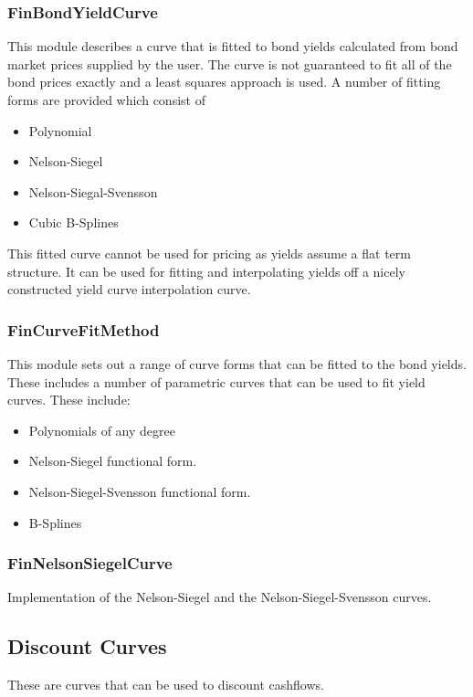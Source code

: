 \documentclass[twoside,11pt]{book}
\begin{document}
\subsubsection*{FinBondYieldCurve}
This module describes a curve that is fitted to bond yields calculated from bond market prices supplied by the user. The curve is not guaranteed to fit all of the bond prices exactly and a least squares approach is used. A number of fitting forms are provided which consist of 

\begin{itemize}
\item{ Polynomial 
}
\item{ Nelson-Siegel
}
\item{ Nelson-Siegal-Svensson
}
\item{ Cubic B-Splines
}
\end{itemize}

This fitted curve cannot be used for pricing as yields assume a flat term structure. It can be used for fitting and interpolating yields off a nicely constructed yield curve interpolation curve.


\subsubsection*{FinCurveFitMethod}
This module sets out a range of curve forms that can be fitted to the bond yields. These includes a number of parametric curves that can be used to fit yield curves. These include:
\begin{itemize}
\item{ Polynomials of any degree 
}
\item{ Nelson-Siegel functional form. 
}
\item{ Nelson-Siegel-Svensson functional form.
}
\item{ B-Splines
}
\end{itemize}


\subsubsection*{FinNelsonSiegelCurve}
Implementation of the Nelson-Siegel and the Nelson-Siegel-Svensson curves.


\subsection*{Discount Curves}
These are curves that can be used to discount cashflows.
\end{document}
